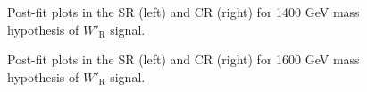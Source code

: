\begin{figure}[H]
  \centering
  \caption{Post-fit plots in the SR (left) and CR (right) for 1400 GeV mass hypothesis of $W'_{\text{R}}$ signal.}
  \label{fig:Postfit_WpRH1400_Asimov}
\end{figure}
\begin{figure}[H]
  \centering
  \caption{Post-fit plots in the SR (left) and CR (right) for 1600 GeV mass hypothesis of $W'_{\text{R}}$ signal.}
  \label{fig:Postfit_WpRH1600_Asimov}
\end{figure}
